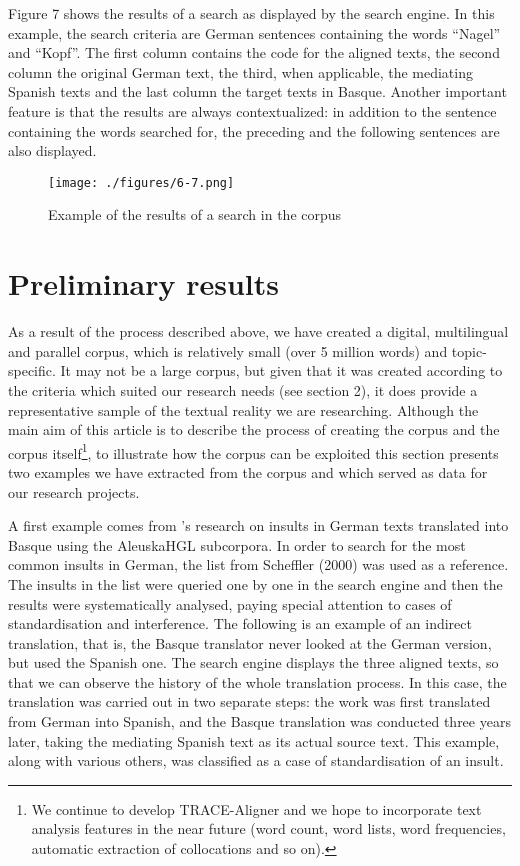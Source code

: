 \documentclass[output=paper]{LSP/langsci}
\begin{document}
Figure 7 shows the results of a search as displayed by the search engine. In this example, the search criteria are German sentences containing the words “Nagel” and “Kopf”. The first column contains the code for the aligned texts, the second column the original German text, the third, when applicable, the mediating Spanish texts and the last column the target texts in Basque. Another important feature is that the results are always contextualized: in addition to the sentence containing the words searched for, the preceding and the following sentences are also displayed.

\begin{figure}
\texttt{[image: ./figures/6-7.png]}
\caption{Example of the results of a search in the corpus}
\end{figure}

\section{Preliminary results}
As a result of the process described above, we have created a digital, multilingual and parallel corpus, which is relatively small (over 5 million words) and topic-specific. It may not be a large corpus, but given that it was created according to the criteria which suited our research needs (see section 2), it does provide a representative sample of the textual reality we are researching. Although the main aim of this article is to describe the process of creating the corpus and the corpus itself\footnote{We continue to develop TRACE-Aligner and we hope to incorporate text analysis features in the near future (word count, word lists, word frequencies, automatic extraction of collocations and so on).}, to illustrate how the corpus can be exploited this section presents two examples we have extracted from the corpus and which served as data for our research projects.

A first example comes from \citeauthor{Zubillaga2013}'s \citeyear{Zubillaga2013} research on insults in German texts translated into Basque using the AleuskaHGL subcorpora. In order to search for the most common insults in German, the list from Scheffler (2000) was used as a reference. The insults in the list were queried one by one in the search engine and then the results were systematically analysed, paying special attention to cases of standardisation and interference. The following is an example of an indirect translation, that is, the Basque translator never looked at the German version, but used the Spanish one. The search engine displays the three aligned texts, so that we can observe the history of the whole translation process. In this case, the translation was carried out in two separate steps: the work was first translated from German into Spanish, and the Basque translation was conducted three years later, taking the mediating Spanish text as its actual source text. This example, along with various others, was classified as a case of standardisation of an insult.
\end{document}
